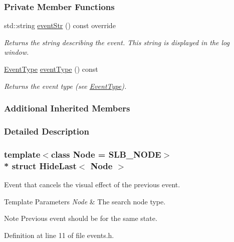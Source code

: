 \subsubsection*{Private Member Functions}
\begin{DoxyCompactItemize}
\item 
std\+::string \hyperlink{structHideLast_ab9eafd5d6c2cb3b8b8027296f8fc8183}{event\+Str} () const override
\begin{DoxyCompactList}\small\item\em Returns the string describing the event. This string is displayed in the log window. \end{DoxyCompactList}\item 
\hyperlink{event__base_8h_a2628ea8d12e8b2563c32f05dc7fff6fa}{Event\+Type} \hyperlink{structHideLast_a02516e4458e48d62313fd4d9f48af6f6}{event\+Type} () const 
\begin{DoxyCompactList}\small\item\em Returns the event type (see \hyperlink{event__base_8h_a2628ea8d12e8b2563c32f05dc7fff6fa}{Event\+Type}). \end{DoxyCompactList}\end{DoxyCompactItemize}
\subsubsection*{Additional Inherited Members}


\subsubsection{Detailed Description}
\subsubsection*{template$<$class Node = S\+L\+B\+\_\+\+N\+O\+DE$>$\\*
struct Hide\+Last$<$ Node $>$}

Event that cancels the visual effect of the previous event. 


\begin{DoxyTemplParams}{Template Parameters}
{\em Node} & The search node type. \\
\hline
\end{DoxyTemplParams}
\begin{DoxyNote}{Note}
Previous event should be for the same state. 
\end{DoxyNote}


Definition at line 11 of file events.\+h.



